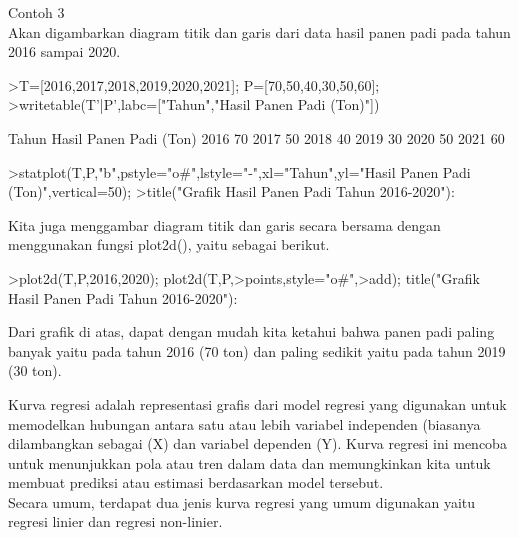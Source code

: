 \documentclass{article}
\begin{document}
\begin{eulernotebook}
\begin{eulercomment}
\begin{eulercomment}
\begin{eulercomment}
Contoh 3\\
Akan digambarkan diagram titik dan garis dari data hasil panen padi
pada tahun 2016 sampai 2020.
\end{eulercomment}
\begin{eulerprompt}
>T=[2016,2017,2018,2019,2020,2021]; P=[70,50,40,30,50,60];
>writetable(T'|P',labc=["Tahun","Hasil Panen Padi (Ton)"])
\end{eulerprompt}
\begin{euleroutput}
       Tahun Hasil Panen Padi (Ton)
        2016                     70
        2017                     50
        2018                     40
        2019                     30
        2020                     50
        2021                     60
\end{euleroutput}
\begin{eulerprompt}
>statplot(T,P,"b",pstyle="o#",lstyle="-",xl="Tahun",yl="Hasil Panen Padi (Ton)",vertical=50);
>title("Grafik Hasil Panen Padi Tahun 2016-2020"):
\end{eulerprompt}
\begin{eulercomment}
Kita juga menggambar diagram titik dan garis secara bersama dengan
menggunakan fungsi plot2d(), yaitu sebagai berikut.
\end{eulercomment}
\begin{eulerprompt}
>plot2d(T,P,2016,2020); plot2d(T,P,>points,style="o#",>add); title("Grafik Hasil Panen Padi Tahun 2016-2020"):
\end{eulerprompt}
\begin{eulercomment}
Dari grafik di atas, dapat dengan mudah kita ketahui bahwa panen padi
paling banyak yaitu pada tahun 2016 (70 ton) dan paling sedikit yaitu
pada tahun 2019 (30 ton).

\begin{eulercomment}
\begin{eulercomment}
Kurva regresi adalah representasi grafis dari model regresi yang
digunakan untuk memodelkan hubungan antara satu atau lebih variabel
independen (biasanya dilambangkan sebagai (X) dan variabel dependen
(Y). Kurva regresi ini mencoba untuk menunjukkan pola atau tren dalam
data dan memungkinkan kita untuk membuat prediksi atau estimasi
berdasarkan model tersebut.\\
Secara umum, terdapat dua jenis kurva regresi yang umum digunakan
yaitu regresi linier dan regresi non-linier.


\end{eulercomment}
\end{eulercomment}
\end{eulercomment}
\end{eulercomment}
\end{eulercomment}
\end{eulernotebook}
\end{document}
